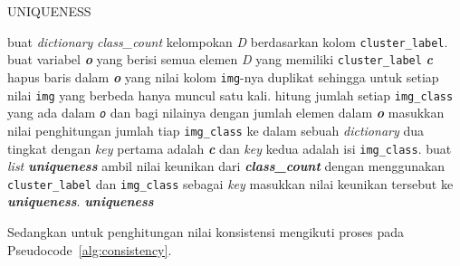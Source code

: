 \begin{algorithm}[H]
	\caption{UNIQUENESS}
	\label{alg:uniqueness}
	\begin{algorithmic}[1]
		\STATE buat \textit{dictionary} \textit{class\_count}
		\STATE kelompokan \textit{D} berdasarkan kolom \texttt{cluster\_label}.
		\STATE buat variabel \textit{\textbf{o}} yang berisi semua elemen \textit{D} yang memiliki \texttt{cluster\_label} \textit{\textbf{c}}
		\STATE hapus baris dalam \textit{\textbf{o}} yang nilai kolom \texttt{img}-nya duplikat sehingga untuk setiap nilai \texttt{img} yang berbeda hanya muncul satu kali.
		\STATE hitung jumlah setiap \texttt{img\_class} yang ada dalam \textit{\texttt{o}} dan bagi nilainya dengan jumlah elemen dalam \textit{\textbf{o}}
		\STATE masukkan nilai penghitungan jumlah tiap \texttt{img\_class} ke dalam sebuah \textit{dictionary} dua tingkat dengan \textit{key} pertama adalah \textit{\textbf{c}} dan \textit{key} kedua adalah isi \texttt{img\_class}.
		\ENDFOR
		\STATE buat \textit{list} \textit{\textbf{uniqueness}}
		\STATE ambil nilai keunikan dari \textit{\textbf{class\_count}} dengan menggunakan \texttt{cluster\_label} dan \texttt{img\_class} sebagai \textit{key}
		\STATE masukkan nilai keunikan tersebut ke \textit{\textbf{uniqueness}}. 
		\ENDFOR
		\RETURN \textit{\textbf{uniqueness}}
	\end{algorithmic}
\end{algorithm}
Sedangkan untuk penghitungan nilai konsistensi mengikuti proses pada Pseudocode~\ref{alg:consistency}. \\
